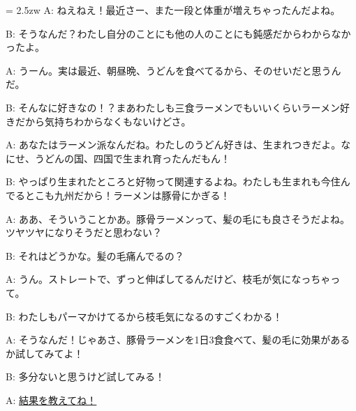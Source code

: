 \documentclass[11pt]{amsart}
\title{}
\author{}
\newenvironment{hangall}[1]{\hangindent = 2.5zw\everypar{\hangindent = 2.5zw}}{}
\begin{document}
\maketitle
\begin{hangall}{}%
A: ねえねえ！最近さー、また一段と体重が増えちゃったんだよね。

B: そうなんだ？わたし自分のことにも他の人のことにも鈍感だからわからなかったよ。

A: うーん。実は最近、朝昼晩、うどんを食べてるから、そのせいだと思うんだ。

B: そんなに好きなの！？まあわたしも三食ラーメンでもいいくらいラーメン好きだから気持ちわからなくもないけどさ。

A: あなたはラーメン派なんだね。わたしのうどん好きは、生まれつきだよ。なにせ、うどんの国、四国で生まれ育ったんだもん！

B: やっぱり生まれたところと好物って関連するよね。わたしも生まれも今住んでるとこも九州だから！ラーメンは豚骨にかぎる！

A: ああ、そういうことかあ。豚骨ラーメンって、髪の毛にも良さそうだよね。ツヤツヤになりそうだと思わない？

B: それはどうかな。髪の毛痛んでるの？

A: うん。ストレートで、ずっと伸ばしてるんだけど、枝毛が気になっちゃって。

B: わたしもパーマかけてるから枝毛気になるのすごくわかる！

A: そうなんだ！じゃあさ、豚骨ラーメンを1日3食食べて、髪の毛に効果があるか試してみてよ！

B: 多分ないと思うけど試してみる！

A: \ul{結果を教えてね！}\end{hangall}
\end{document}

